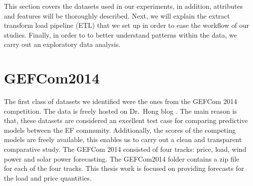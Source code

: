 






This section covers the datasets used in our experiments, in addition, attributes and features will be thoroughly described.
Next, we will explain the extract transform load pipeline (ETL) that we set up in order to ease the workflow of our studies.
Finally, in order to to better understand patterns within the data, we carry out an exploratory data analysis.

\section{GEFCom2014}
The first class of datasets we identified were the ones from the GEFCom 2014 competition. The data is freely hosted on Dr.\ Hong blog \cite{hong2016probabilistic}.
The main reason is that, these datasets are considered an excellent test case for comparing predictive models between the EF community. Additionally, the scores of the competing models are freely available, this enables us to carry out a clean and transparent comparative study.
The GEFCom 2014 consisted of four tracks: price, load, wind power and solar power forecasting. 
The GEFCom2014 folder contains a zip file for each of the four tracks.
This thesis work is focused on providing forecasts for the load and price quantities.
\\
